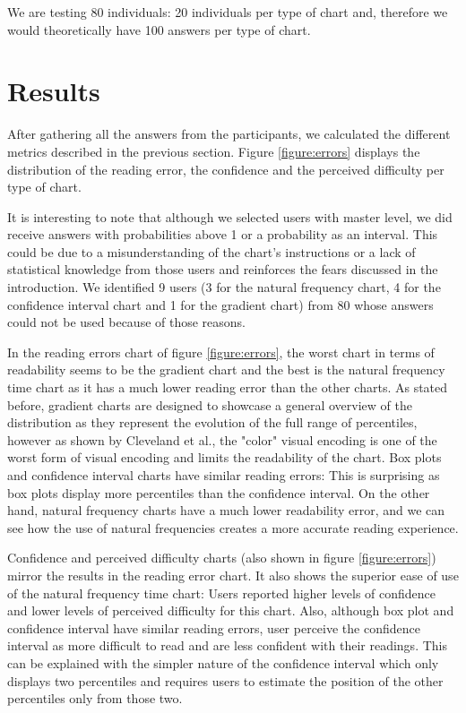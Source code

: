 \documentclass[a4paper,3p,sort&compress]{elsarticle}
\begin{document}
We are testing 80 individuals: 20 individuals per type of chart and, therefore we would theoretically have 100 answers per 
type of chart.

\section{Results}
\label{sec:results}


After gathering all the answers from the participants, we calculated the different metrics described in the previous section.
 Figure \ref{figure:errors} displays 
the distribution of the reading error, the confidence and the perceived difficulty per type of chart. 

It is interesting to note that although we selected users with master level, we did receive answers with probabilities 
above 1 or a probability as an interval. This could be due to a misunderstanding of the chart's instructions or 
a lack of statistical knowledge from those 
users and reinforces the fears discussed in the introduction. We identified 9 users (3 for the natural frequency chart, 
4 for the confidence interval chart and 1 for the gradient chart)
 from 80 whose answers could not be used because of those reasons.

In the reading errors chart of figure \ref{figure:errors}, the worst chart in terms of readability seems to be the 
gradient chart and the best is the natural frequency time chart as it has a much lower reading error than the other charts. As stated before, 
gradient charts are designed to showcase a general overview of the distribution as they represent the evolution of the
full range of percentiles, however as shown by Cleveland et al., the "color" visual encoding is one of the 
worst form of visual encoding and limits the readability of the chart. Box plots and confidence interval charts have similar reading errors: This is surprising
as box plots display more percentiles than the confidence interval. On the other hand, natural 
frequency charts have a much lower readability error, and we can see how the use of natural frequencies creates a more accurate reading experience.

Confidence and perceived difficulty charts (also shown in figure \ref{figure:errors}) mirror the results in the reading error chart.
It also shows the superior ease of use 
of the natural frequency time chart: Users reported higher levels of confidence and 
lower levels of perceived difficulty for this chart. Also, although box plot and confidence interval have similar reading errors,
user perceive the confidence interval as more difficult to read and are less confident with their readings. This can be explained with 
the simpler nature of the confidence interval which only displays two percentiles and requires users to estimate the position of the other 
percentiles only from those two.
\end{document}
